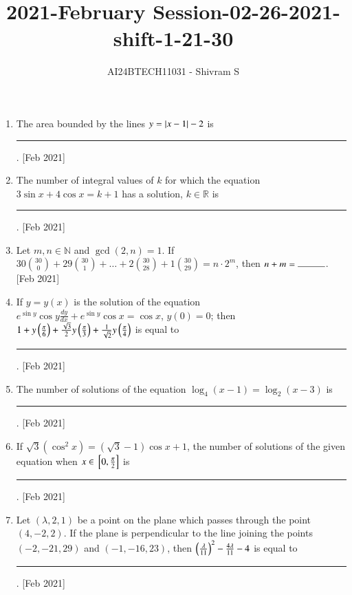 \documentclass[journal]{IEEEtran}
\begin{document}

\onecolumn

\title{2021-February Session-02-26-2021-shift-1-21-30}
\author{AI24BTECH11031 - Shivram S}
\maketitle
\bigskip

\renewcommand{\thefigure}{\theenumi}
\renewcommand{\thetable}{\theenumi}

\begin{enumerate}
    \item The area bounded by the lines $y = \left\vert x - 1\right\vert - 2$ is \rule{1cm}{0.15mm}.
    \hfill{[Feb 2021]}
    
    \item The number of integral values of $k$ for which the equation
    $3\sin x + 4\cos x = k + 1$ has a solution, $k \in \mathbb{R}$ is \rule{1cm}{0.15mm}.
    \hfill{[Feb 2021]}

    \item Let $m, n \in \mathbb{N}$ and $\gcd(2, n) = 1$. If
    $30\binom{30}{0} + 29\binom{30}{1} + \dots + 2\binom{30}{28} + 1\binom{30}{29} = n \cdot 2^m$,
    then $n + m = \rule{1cm}{0.15mm}$.
    \hfill{[Feb 2021]}

    \item If $y = y(x)$ is the solution of the equation $e^{\sin y}\cos y \frac{dy}{dx} + e^{\sin y}\cos x = \cos x$,
    $y(0) = 0$; then $1 + y\left(\frac{\pi}{6}\right) + \frac{\sqrt{3}}{2} y\left(\frac{\pi}{3}\right) + \frac{1}{\sqrt{2}} y\left(\frac{\pi}{4}\right)$
    is equal to \rule{1cm}{0.15mm}.
    \hfill{[Feb 2021]}

    \item The number of solutions of the equation $\log_4(x - 1) = \log_2(x - 3)$ is \rule{1cm}{0.15mm}.
    \hfill{[Feb 2021]}
    
    \item If $\sqrt{3}(\cos^2 x) = (\sqrt{3} - 1) \cos x + 1$, the number of solutions
    of the given equation when $x \in {}\left[0, \frac{\pi}{2}\right]$ is \rule{1cm}{0.15mm}.
    \hfill{[Feb 2021]}

    \item Let $(\lambda, 2, 1)$ be a point on the plane which passes through the point
    $(4, -2, 2)$. If the plane is perpendicular to the line joining the points
    $(-2, -21, 29)$ and $(-1, -16, 23)$, then $\left(\frac{\lambda}{11}\right)^2 - \frac{4\lambda}{11} - 4$
    is equal to \rule{1cm}{0.15mm}.
    \hfill{[Feb 2021]}


\end{enumerate}
\end{document}
